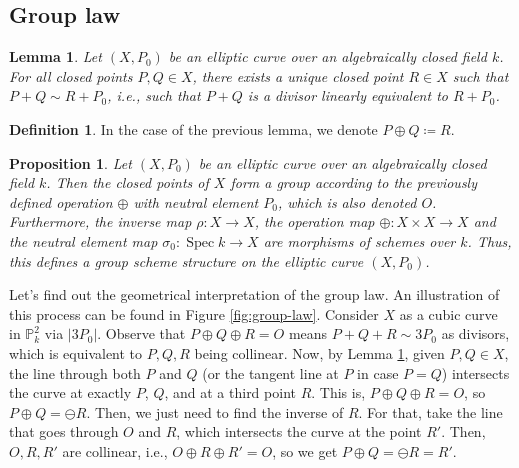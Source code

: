 \documentclass{report}
\DeclareMathOperator{\Spec}{Spec}
\newtheorem{proposition}[theorem]{Proposition}
\newtheorem{lemma}[theorem]{Lemma}
\theoremstyle{definition}
\newtheorem{definition}[theorem]{Definition}
\begin{document}
\subsection{Group law}
\label{Sse:elliptic-curves-group-law}

\begin{lemma}
\label{Lem:existscollinear}
Let $(X,P_0)$ be an elliptic curve over an algebraically closed field $k$. For all closed points $P,Q\in X$, there exists a unique closed point $R\in X$ such that $P+Q\sim R+P_0$, i.e., such that $P+Q$ is a divisor linearly equivalent to $R+P_0$.
\end{lemma}

\begin{definition}
In the case of the previous lemma, we denote $P\oplus Q\coloneqq R$.
\end{definition}

\begin{proposition}
Let $(X,P_0)$ be an elliptic curve over an algebraically closed field $k$. Then the closed points of $X$ form a group according to the previously defined operation $\oplus$ with neutral element $P_0$, which is also denoted $O$. Furthermore, the inverse map $\rho:X\rightarrow X$, the operation map $\oplus:X\times X\rightarrow X$ and the neutral element map $\sigma_0:\Spec k\rightarrow X$ are morphisms of schemes over $k$. Thus, this defines a group scheme structure on the elliptic curve $(X,P_0)$.
\end{proposition}

Let's find out the geometrical interpretation of the group law. An illustration of this process can be found in Figure \ref{fig:group-law}. Consider $X$ as a cubic curve in $\mathbb{P}_k^2$ via $|3P_0|$. Observe that $P\oplus Q\oplus R=O$ means $P+Q+R\sim3P_0$ as divisors, which is equivalent to $P,Q,R$ being collinear. Now, by Lemma \ref{Lem:existscollinear}, given $P,Q\in X$, the line through both $P$ and $Q$ (or the tangent line at $P$ in case $P=Q$) intersects the curve at exactly $P$, $Q$, and at a third point $R$. This is, $P\oplus Q\oplus R=O$, so $P\oplus Q=\ominus R$. Then, we just need to find the inverse of $R$. For that, take the line that goes through $O$ and $R$, which intersects the curve at the point $R'$. Then, $O,R,R'$ are collinear, i.e., $O\oplus R\oplus R'=O$, so we get $P\oplus Q=\ominus R=R'$.
\end{document}
